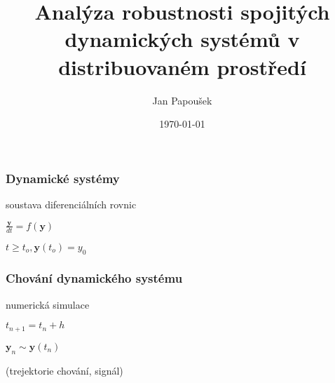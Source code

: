 \documentclass[xcolor=svgnames]{beamer}
\title[Parasim]{Analýza robustnosti spojitých dynamických systémů v distribuovaném prostředí}
\author{Jan Papoušek}
\institute{Masaryk University Brno}
\date{\today}
\begin{document}
\frame[plain]{\titlepage}
\begin{frame}
	\frametitle{Dynamické systémy}
	\begin{center}
		soustava diferenciálních rovnic

		\bigskip
		\bigskip

		{\Huge$\frac{\textbf{y}}{dt} = f(\textbf{y})$}

		\bigskip
		$t \geq t_o, \textbf{y}(t_o) = y_0$
	\end{center}	
\end{frame}
\begin{frame}
	\frametitle{Chování dynamického systému}
	\begin{center}
		numerická simulace
		
		\bigskip
		\bigskip
		
		{\large$t_{n+1} = t_n + h$}
		
		\bigskip
		{\Huge$\textbf{y}_n \sim \textbf{y}(t_n)$}
		
		\bigskip
		\bigskip
		(trejektorie chování, signál)
	\end{center}		
\end{frame}
\end{document}

